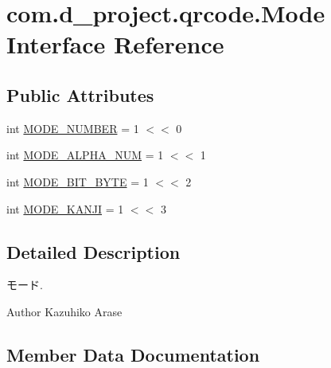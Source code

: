 \hypertarget{interfacecom_1_1d__project_1_1qrcode_1_1_mode}{}\section{com.\+d\+\_\+project.\+qrcode.\+Mode Interface Reference}
\label{interfacecom_1_1d__project_1_1qrcode_1_1_mode}
\subsection*{Public Attributes}
\begin{DoxyCompactItemize}
\item 
int \hyperlink{interfacecom_1_1d__project_1_1qrcode_1_1_mode_aebf48a305be32be20368c376e931d902}{M\+O\+D\+E\+\_\+\+N\+U\+M\+B\+ER} = 1 $<$$<$ 0
\item 
int \hyperlink{interfacecom_1_1d__project_1_1qrcode_1_1_mode_a05f57cb8b405c50a031cf0e148e078df}{M\+O\+D\+E\+\_\+\+A\+L\+P\+H\+A\+\_\+\+N\+UM} = 1 $<$$<$ 1
\item 
int \hyperlink{interfacecom_1_1d__project_1_1qrcode_1_1_mode_ae9b0b2993384f84113c29394ce31a721}{M\+O\+D\+E\+\_\+B\+I\+T\+\_\+\+B\+Y\+TE} = 1 $<$$<$ 2
\item 
int \hyperlink{interfacecom_1_1d__project_1_1qrcode_1_1_mode_ae75b6b917dc8d86693ac71a032ba81d8}{M\+O\+D\+E\+\_\+\+K\+A\+N\+JI} = 1 $<$$<$ 3
\end{DoxyCompactItemize}


\subsection{Detailed Description}
モード. \begin{DoxyAuthor}{Author}
Kazuhiko Arase 
\end{DoxyAuthor}


\subsection{Member Data Documentation}
\mbox{\label{interfacecom_1_1d__project_1_1qrcode_1_1_mode_ae9b0b2993384f84113c29394ce31a721}} 
